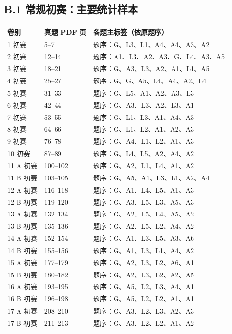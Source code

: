 \subsection*{B.1 常规初赛：主要统计样本}
{\small\renewcommand{\arraystretch}{1.18}
\begin{longtable}{P{2.8cm}P{1.8cm}P{10.8cm}}
\toprule 卷别 & 真题 PDF 页 & 各题主标签（依原题序）\\\midrule{} 初赛 & 5--7 & 题序：G、L3、L1、A4、A4、A3、A2\\
2 初赛 & 12--14 & 题序：A1、L3、A2、A3、G、L4、A3、A5\\
3 初赛 & 18--21 & 题序：G、A3、L3、A2、A1、L1、A5\\
4 初赛 & 25--27 & 题序：G、G、A5、L4、A4、A2、L4\\
5 初赛 & 31--33 & 题序：G、L5、A1、A2、A3、L3\\
6 初赛 & 42--44 & 题序：G、A3、L3、A2、L3、A1\\
7 初赛 & 53--55 & 题序：G、L1、L3、A1、A4、A3\\
8 初赛 & 64--66 & 题序：G、L1、L2、A1、A2、A3\\
9 初赛 & 76--78 & 题序：G、A4、L1、L2、A1、A3\\
10 初赛 & 87--89 & 题序：G、L4、L5、A2、A4、A2\\
11 A 初赛 & 100--102 & 题序：G、A2、L1、L4、A1、A2\\
11 B 初赛 & 103--105 & 题序：G、A5、A1、L3、L1、A2、A4\\
12 A 初赛 & 116--118 & 题序：G、A1、L4、L5、A1、A3\\
12 B 初赛 & 119--120 & 题序：G、A3、L5、L3、A5、A3\\
13 A 初赛 & 132--134 & 题序：G、A2、L5、L4、A5、A2\\
13 B 初赛 & 135--136 & 题序：G、A2、L5、L2、A4、A2\\
14 A 初赛 & 152--154 & 题序：G、A1、L3、L5、A3、A6\\
14 B 初赛 & 155--156 & 题序：G、A1、L3、L1、A4、A2\\
15 A 初赛 & 177--179 & 题序：G、A2、L3、L2、A6、A1\\
15 B 初赛 & 180--182 & 题序：G、A2、L3、L2、A2、A5\\
16 A 初赛 & 193--195 & 题序：G、A5、L2、L3、A4、A1\\
16 B 初赛 & 196--198 & 题序：G、A5、L2、L2、A1、A1\\
17 A 初赛 & 208--210 & 题序：G、A3、L2、L3、A2、A3\\
17 B 初赛 & 211--213 & 题序：G、A3、L2、L2、A1、A2\\
\bottomrule\end{longtable}}

